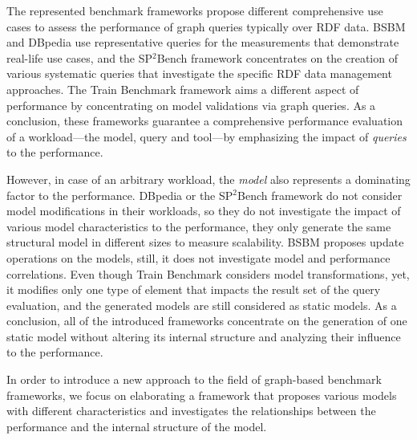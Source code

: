 The represented benchmark frameworks propose different comprehensive use cases to assess the performance of graph queries typically over RDF data. BSBM and DBpedia use representative queries for the measurements that demonstrate real-life use cases, and the SP$^2$Bench framework concentrates on the creation of various systematic queries that investigate the specific RDF data management approaches. The Train Benchmark framework aims a different aspect of performance by concentrating on model validations via graph queries. As a conclusion, these frameworks guarantee a comprehensive performance evaluation of a workload---the model, query and tool---by emphasizing the impact of \textit{queries} to the performance.

However, in case of an arbitrary workload, the \textit{model} also represents a dominating factor to the performance. DBpedia or the SP$^2$Bench framework do not consider model modifications in their workloads, so they do not investigate the impact of various model characteristics to the performance, they only generate the same structural model in different sizes to measure scalability. BSBM proposes update operations on the models, still, it does not investigate model and performance correlations. Even though Train Benchmark considers model transformations, yet, it modifies only one type of element that impacts the result set of the query evaluation, and the generated models are still considered as static models. As a conclusion, all of the introduced frameworks concentrate on the generation of one static model without altering its internal structure and analyzing their influence to the performance.

In order to introduce a new approach to the field of graph-based benchmark frameworks, we focus on elaborating a framework that proposes various models with different characteristics and investigates the relationships between the performance and the internal structure of the model.

